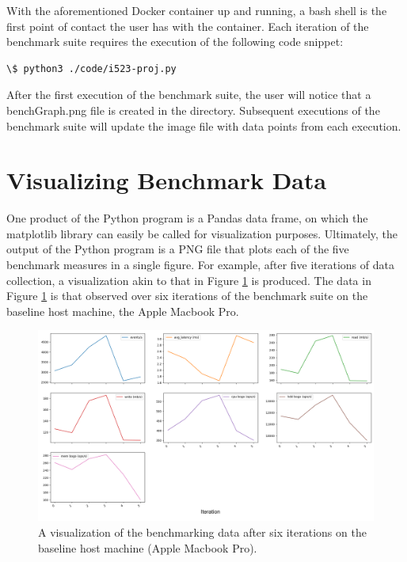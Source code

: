 \documentclass[sigconf]{acmart}
\begin{document}
With the aforementioned Docker container up and running, a bash shell is the first point of contact the user has with the container. Each iteration of the benchmark suite requires the execution of the following code snippet:

\begin{lstlisting}
\$ python3 ./code/i523-proj.py
\end{lstlisting}

After the first execution of the benchmark suite, the user will notice that a benchGraph.png file is created in the directory. Subsequent executions of the benchmark suite will update the image file with data points from each execution.

\section{Visualizing Benchmark Data}

One product of the Python program is a Pandas data frame, on which the matplotlib library can easily be called for visualization purposes. Ultimately, the output of the Python program is a PNG file that plots each of the five benchmark measures in a single figure. For example, after five iterations of data collection, a visualization akin to that in Figure \ref{f:plotMBP} is produced. The data in Figure \ref{f:plotMBP} is that observed over six iterations of the benchmark suite on the baseline host machine, the Apple Macbook Pro.

\begin{figure}[!ht]
  \centering\includegraphics[width=\columnwidth]{images/samplePlot.png}
  \caption{A visualization of the benchmarking data after six iterations on the baseline host machine (Apple Macbook Pro).}\label{f:plotMBP}
\end{figure}
\end{document}
